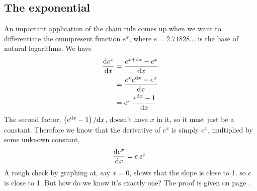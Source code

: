 \subsection{The exponential}
An important application of the chain rule comes up when we want to differentiate
the omnipresent function $e^x$, where $e=2.71828\ldots$ is the base of natural
logarithms. We have
\begin{align*}
  \frac{\textup{d} e^x}{\textup{d} x} &= \frac{e^{x+\textup{d} x}-e^x}{\textup{d} x} \\
                          &= \frac{e^x e^{\textup{d} x}-e^x}{\textup{d} x} \\
                          &= e^x \: \frac{e^{\textup{d} x}-1}{\textup{d} x}
\end{align*}
The second factor, $\left(e^{\textup{d} x}-1\right)/\textup{d} x$, doesn't have $x$ in it, so it
must just be a constant. Therefore we know that the derivative of $e^x$ is simply
$e^x$, multiplied by some unknown constant,
\begin{equation*}
  \frac{\textup{d} e^x}{\textup{d} x} = c\:e^x .
\end{equation*}
A rough check by graphing at, say $x=0$, shows that the slope is close to 1, so $c$ is close to
1. But how do we know it's exactly one? The proof is given on page \pageref{detour:exp}.\label{main:exp}

\pagebreak[4]

